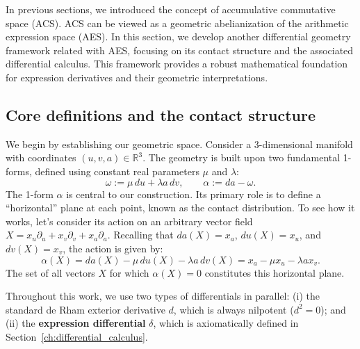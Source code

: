 In previous sections, we introduced the concept of accumulative commutative space (ACS).
ACS can be viewed as a geometric abelianization of the arithmetic expression space (AES).
In this section, we develop another differential geometry framework related with AES, focusing on its contact structure and the associated differential calculus.
This framework provides a robust mathematical foundation for expression derivatives and their geometric interpretations.

\subsection{Core definitions and the contact structure}\label{subsec:core_definitions}

We begin by establishing our geometric space. Consider a 3-dimensional manifold with coordinates $(u,v,a) \in \mathbb{R}^3$. The geometry is built upon two fundamental 1-forms, defined using constant real parameters $\mu$ and $\lambda$:
\begin{equation}\label{eq:contact_forms_def}
\omega := \mu\,du + \lambda a\,dv, \qquad \alpha := da - \omega.
\end{equation}
The 1-form $\alpha$ is central to our construction. Its primary role is to define a ``horizontal'' plane at each point, known as the contact distribution. To see how it works, let's consider its action on an arbitrary vector field $X = x_u \partial_u + x_v \partial_v + x_a \partial_a$. Recalling that $da(X) = x_a$, $du(X) = x_u$, and $dv(X) = x_v$, the action is given by:
\[
\alpha(X) = da(X) - \mu\,du(X) - \lambda a\,dv(X) = x_a - \mu x_u - \lambda a x_v.
\]
The set of all vectors $X$ for which $\alpha(X)=0$ constitutes this horizontal plane.

Throughout this work, we use two types of differentials in parallel: (i) the standard de Rham exterior derivative $d$, which is always nilpotent ($d^2=0$); and (ii) the \textbf{expression differential} $\delta$, which is axiomatically defined in Section~\ref{ch:differential_calculus}.


